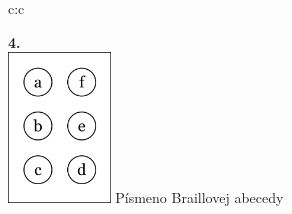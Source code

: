 \documentclass[10pt]{report}
\begin{document}
\begin{tabular}{c:c}
\begin{minipage}[c][104.5mm][t]{0.5\linewidth}
\begin{center}
\begin{minipage}{0.79\linewidth}
\begin{center}
\begin{varwidth}{\linewidth}
\begin{enumerate}
\end{enumerate}
\end{varwidth}
\end{center}
\end{minipage}
\begin{minipage}{0.20\linewidth}
\begin{center}
{\Huge\bfseries 4.} \\[2mm]
\includegraphics[height=40mm]{../images/braille.png}
{\small Písmeno Braillovej abecedy}
\end{center}
\end{minipage}
\end{center}
\end{minipage}
%
\end{tabular}
\newpage
\thispagestyle{empty}
\end{document}
